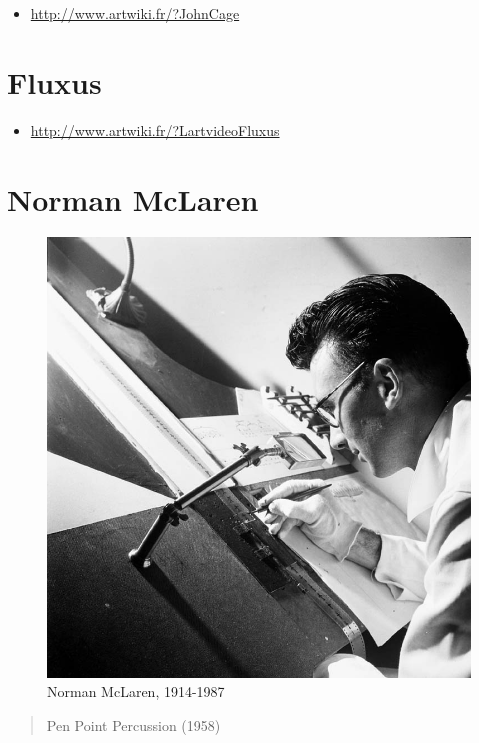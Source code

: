 \documentclass[
]{book}
\providecommand{\tightlist}{%
  \setlength{\itemsep}{0pt}\setlength{\parskip}{0pt}}
\begin{document}
\begin{itemize}
\tightlist
\item
  \url{http://www.artwiki.fr/?JohnCage}
\end{itemize}

\hypertarget{fluxus}{%
\section{Fluxus}\label{fluxus}}

\begin{itemize}
\tightlist
\item
  \url{http://www.artwiki.fr/?LartvideoFluxus}
\end{itemize}

\hypertarget{norman-mclaren}{%
\section{Norman McLaren}\label{norman-mclaren}}

\begin{figure}
\centering
\includegraphics{medias/corpus/mclaren/Norman_McLaren_drawing_on_film_-_1944.jpg}
\caption{Norman McLaren, 1914-1987}
\end{figure}

\begin{quote}
Pen Point Percussion (1958)
\end{quote}
\end{document}
